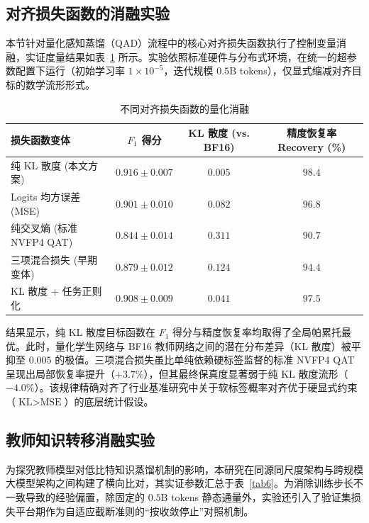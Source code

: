 \documentclass[11pt, a4paper]{article}
\begin{document}
\subsection{对齐损失函数的消融实验}

本节针对量化感知蒸馏（QAD）流程中的核心对齐损失函数执行了控制变量消融，实证度量结果如表~\ref{tab5} 所示。实验依照标准硬件与分布式环境，在统一的超参数配置下运行（初始学习率 $1 \times 10^{-5}$，迭代规模 $0.5\text{B}$ tokens），仅显式缩减对齐目标的数学流形形式。

\begin{table}[htbp]
\centering
\caption{不同对齐损失函数的量化消融}
\label{tab5}
\small
\renewcommand{\arraystretch}{1.25}
\begin{tabular}{lccc}
\toprule
\textbf{损失函数变体} & \textbf{$F_1$ 得分} & \textbf{KL 散度 (vs. BF16)} & \textbf{精度恢复率 Recovery (\%)} \\
\midrule
纯 KL 散度 (本文方案) & $\mathbf{0.916 \pm 0.007}$ & $\mathbf{0.005}$ & $\mathbf{98.4}$ \\
Logits 均方误差 (MSE) & $0.901 \pm 0.010$ & $0.082$ & $96.8$ \\
纯交叉熵 (标准 NVFP4 QAT) & $0.844 \pm 0.014$ & $0.311$ & $90.7$ \\
三项混合损失 (早期变体) & $0.879 \pm 0.012$ & $0.124$ & $94.4$ \\
KL 散度 + 任务正则化 & $0.908 \pm 0.009$ & $0.041$ & $97.5$ \\
\bottomrule
\end{tabular}
\end{table}

结果显示，纯 KL 散度目标函数在 $F_1$ 得分与精度恢复率均取得了全局帕累托最优。此时，量化学生网络与 BF16 教师网络之间的潜在分布差异（KL 散度）被平抑至 $0.005$ 的极值。三项混合损失虽比单纯依赖硬标签监督的标准 NVFP4 QAT 呈现出局部恢复率提升（$+3.7\%$），但其最终保真度显著弱于纯 KL 散度流形（$-4.0\%$）。该规律精确对齐了行业基准研究中关于软标签概率对齐优于硬显式约束（$\text{KL} > \text{MSE}$）的底层统计假设。

\subsection{教师知识转移消融实验}

为探究教师模型对低比特知识蒸馏机制的影响，本研究在同源同尺度架构与跨规模大模型架构之间构建了横向比对，其实证参数汇总于表~\ref{tab6}。为消除训练步长不一致导致的经验偏置，除固定的 $0.5\text{B}$ tokens 静态通量外，实验还引入了验证集损失平台期作为自适应截断准则的“按收敛停止”对照机制。
\end{document}
